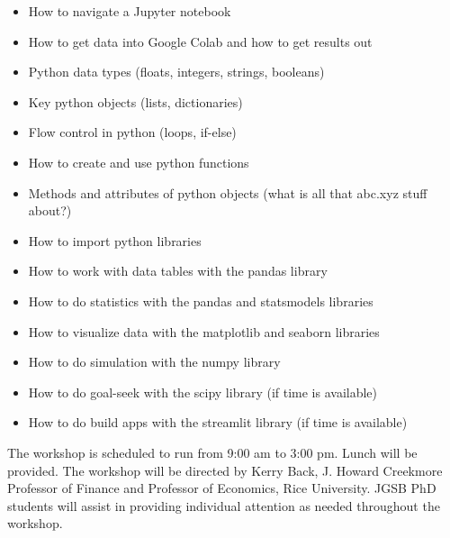 \documentclass[11pt]{scrartcl}
\begin{document}
\begin{itemize}[itemsep=0ex]
\item How to navigate a Jupyter notebook
\item How to get data into Google Colab and how to get results out
\item Python data types (floats, integers, strings, booleans)
\item Key python objects (lists, dictionaries)
\item Flow control in python (loops, if-else)
\item How to create and use python functions
\item Methods and attributes of python objects (what is all that abc.xyz stuff about?)
\item How to import python libraries
\item How to work with data tables with the pandas library
\item How to do statistics with the pandas and statsmodels libraries
\item How to visualize data with the matplotlib and seaborn libraries
\item How to do simulation with the numpy library
\item How to do goal-seek with the scipy library (if time is available)
\item How to do build apps with the streamlit library (if time is available)
\end{itemize}

The workshop is scheduled to run from 9:00 am to 3:00 pm.  Lunch will be provided.  The workshop will be directed by Kerry Back, J. Howard Creekmore Professor of Finance and Professor of Economics, Rice University.    JGSB PhD students will assist in providing individual attention as needed throughout the workshop.
\end{document}
